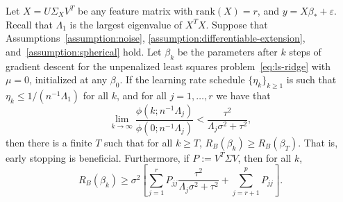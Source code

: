 \documentclass[10pt,a4paper]{amsart}
\begin{document}
\begin{theorem} \label{thm:earlystopping}
Let $X = U \Sigma_X V^T$ be any feature matrix with $\mathrm{rank}(X) = r$, and $y = X \beta_* + \varepsilon$. Recall that $\Lambda_1$ is the largest eigenvalue of $X^T X$. Suppose that Assumptions~\ref{assumption:noise}, \ref{assumption:differentiable-extension}, and~\ref{assumption:spherical} hold.
Let $\beta_k$ be the parameters after $k$ steps of gradient descent for the unpenalized least squares problem~\eqref{eq:ls-ridge} with $\mu = 0$, initialized at any $\beta_0$.
If the learning rate schedule $\{ \eta_k \}_{k \geq 1}$ is such that $\eta_k \le 1 / (n^{-1} \Lambda_1)$ for all $k$, and for all $j = 1, \ldots, r$ we have that 
\begin{equation} \label{eq:earlystopping_condition}
    \lim_{k \to \infty} \frac{\phi(k; n^{-1} \Lambda_j)}{\phi(0; n^{-1} \Lambda_j)} < \frac{\tau^2}{\Lambda_j \sigma^2 + \tau^2},
\end{equation}
then there is a finite $T$ such that for all $k \ge T$, $R_B(\beta_k) \ge R_B(\beta_T)$. That is, early stopping is beneficial.
Furthermore, if $P := V^T\Sigma V$, then for all $k$, 
\begin{equation} \label{eq:earlystopping_lower}
   R_B(\beta_k) \ge \sigma^2\left[ \sum_{j=1}^r P_{jj}\frac{\tau^2}{\Lambda_j\sigma^2 + \tau^2} + \sum_{j=r+1}^p P_{jj}\right].
\end{equation}
\end{theorem}
\end{document}

